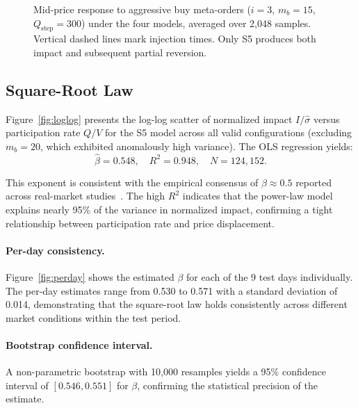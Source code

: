 \documentclass[sigplan,screen,anonymous]{acmart}
\begin{document}
\begin{figure}[t]
  \centering
  \caption{Mid-price response to aggressive buy meta-orders ($i=3$, $m_b=15$, $Q_{\text{step}}=300$) under the four models, averaged over 2{,}048 samples. Vertical dashed lines mark injection times. Only S5 produces both impact and subsequent partial reversion.}
  \label{fig:midprice}
\end{figure}


\subsection{Square-Root Law}
\label{sec:sqrtlaw}

Figure~\ref{fig:loglog} presents the log-log scatter of normalized impact $I/\hat{\sigma}$ versus participation rate $Q/V$ for the S5 model across all valid configurations (excluding $m_b = 20$, which exhibited anomalously high variance). The OLS regression yields:
\begin{equation}
  \hat{\beta} = 0.548, \quad R^2 = 0.948, \quad N = 124{,}152.
  \label{eq:result_beta}
\end{equation}

This exponent is consistent with the empirical consensus of $\beta \approx 0.5$ reported across real-market studies~\cite{almgren2005direct, toth2011anomalous, lillo2003master}. The high $R^2$ indicates that the power-law model explains nearly 95\% of the variance in normalized impact, confirming a tight relationship between participation rate and price displacement.

\paragraph{Per-day consistency.} Figure~\ref{fig:perday} shows the estimated $\beta$ for each of the 9 test days individually. The per-day estimates range from 0.530 to 0.571 with a standard deviation of 0.014, demonstrating that the square-root law holds consistently across different market conditions within the test period.

\paragraph{Bootstrap confidence interval.} A non-parametric bootstrap with 10{,}000 resamples yields a 95\% confidence interval of $[0.546, 0.551]$ for $\beta$, confirming the statistical precision of the estimate.
\end{document}
